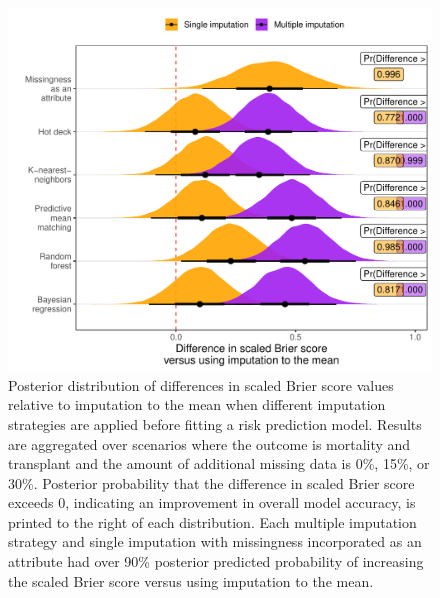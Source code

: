 \documentclass{article}
\begin{document}
\clearpage

\begin{figure}

{\centering \includegraphics{doc_arxiv_files/figure-latex/fig_md_strat_infer_ipa-1} 

}

\caption{Posterior distribution of differences in scaled Brier score values relative to imputation to the mean when different imputation strategies are applied before fitting a risk prediction model. Results are aggregated over scenarios where the outcome is mortality and transplant and the amount of additional missing data is 0\%, 15\%, or 30\%. Posterior probability that the difference in scaled Brier score exceeds 0, indicating an improvement in overall model accuracy, is printed to the right of each distribution. Each multiple imputation strategy and single imputation with missingness incorporated as an attribute had over 90\% posterior predicted probability of increasing the scaled Brier score versus using imputation to the mean.}\label{fig:fig_md_strat_infer_ipa}
\end{figure}

\clearpage
\end{document}
